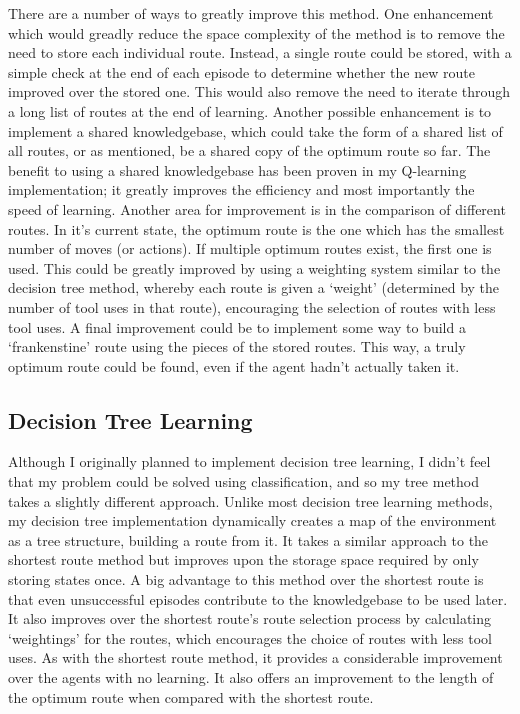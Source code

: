 \documentclass[a4paper,oneside]{report}
\begin{document}
There are a number of ways to greatly improve this method. One enhancement which would greadly reduce the space complexity of the method is to remove the need to store each individual route. Instead, a single route could be stored, with a simple check at the end of each episode to determine whether the new route improved over the stored one. This would also remove the need to iterate through a long list of routes at the end of learning. Another possible enhancement is to implement a shared knowledgebase, which could take the form of a shared list of all routes, or as mentioned, be a shared copy of the optimum route so far. The benefit to using a shared knowledgebase has been proven in my Q-learning implementation; it greatly improves the efficiency and most importantly the speed of learning. Another area for improvement is in the comparison of different routes. In it's current state, the optimum route is the one which has the smallest number of moves (or actions). If multiple optimum routes exist, the first one is used. This could be greatly improved by using a weighting system similar to the decision tree method, whereby each route is given a `weight' (determined by the number of tool uses in that route), encouraging the selection of routes with less tool uses. A final improvement could be to implement some way to build a `frankenstine' route using the pieces of the stored routes. This way, a truly optimum route could be found, even if the agent hadn't actually taken it.

\subsection{Decision Tree Learning}

Although I originally planned to implement decision tree learning, I didn't feel that my problem could be solved using classification, and so my tree method takes a slightly different approach. Unlike most decision tree learning methods, my decision tree implementation dynamically creates a map of the environment as a tree structure, building a route from it. It takes a similar approach to the shortest route method but improves upon the storage space required by only storing states once. A big advantage to this method over the shortest route is that even unsuccessful episodes contribute to the knowledgebase to be used later. It also improves over the shortest route's route selection process by calculating `weightings' for the routes, which encourages the choice of routes with less tool uses. As with the shortest route method, it provides a considerable improvement over the agents with no learning. It also offers an improvement to the length of the optimum route when compared with the shortest route. 
\end{document}
